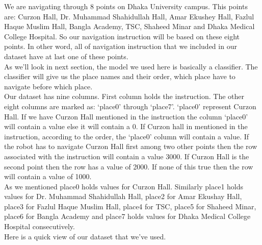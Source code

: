 We are navigating through 8 points on Dhaka University campus. This points are: Curzon Hall, Dr. Muhammad Shahidullah Hall, Amar Ekushey Hall, Fazlul Haque Muslim Hall, Bangla Academy, TSC, Shaheed Minar and Dhaka Medical College Hospital. So our navigation instruction will be based on these eight points. In other word, all of navigation instruction that we included in our dataset have at last one of these points. \\

As we'll look in next section, the model we used here is basically a classifier. The classifier will give us the place names and their order, which place have to navigate before which place.\\

Our dataset has nine columns. First column holds the instruction. The other eight columns are marked as: `place0' through `place7'. `place0' represent Curzon Hall. If we have Curzon Hall mentioned in the instruction the column `place0' will contain a value else it will contain a 0. If Curzon hall in mentioned in the instruction, according to the order, the `place0' column will contain a value. If the robot has to navigate Curzon Hall first among two other points then the row associated with the instruction will contain a value 3000. If Curzon Hall is the second point then the row has a value of 2000. If none of this true then the row will contain a value of 1000. \\

As we mentioned place0 holds values for Curzon Hall. Similarly place1 holds values for Dr. Muhammad Shahidullah Hall, place2 for Amar Ekushay Hall, place3 for Fazlul Haque Muslim Hall, place4 for TSC, place5 for Shaheed Minar, place6 for Bangla Academy and place7 holds values for Dhaka Medical College Hospital consecutively. \\

Here is a quick view of our dataset that we've used. \\


